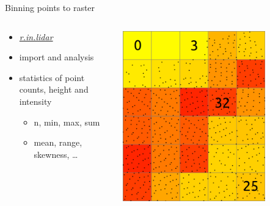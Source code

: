 \documentclass[xcolor={dvipsnames,usenames},beamer,aspectratio=43]{beamer}
\newcommand{\gmodule}[1]{\href{http://grass.osgeo.org/grass71/manuals/#1.html}{\emph{#1}}}
\begin{document}
\begin{frame}{Binning points to raster}

\begin{columns}
\begin{column}{0.4\textwidth}

 \begin{itemize}
  \item \gmodule{r.in.lidar}
  \item import and analysis
  \item statistics of point counts, height and intensity
  \begin{itemize}
    \item n, min, max, sum
    \item mean, range, skewness, \ldots
  \end{itemize}
\end{itemize}

\end{column}
\begin{column}{0.45\textwidth}

\begin{center}
  \includegraphics[width=0.75\textwidth]{features/binning_count}
\end{center}

\end{column}
\end{columns}

\end{frame}
\end{document}
